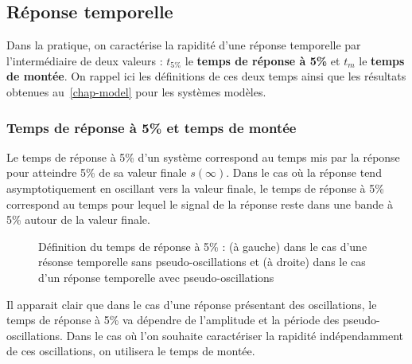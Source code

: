 \subsection{Réponse temporelle}
Dans la pratique, on caractérise la rapidité d'une réponse temporelle par 
l'intermédiaire de deux valeurs : $t_{5\%}$ le \textbf{temps de réponse à 5\%}
et $t_m$ le \textbf{temps de montée}. 
On rappel ici les définitions de ces deux temps ainsi que 
les résultats obtenues au~\cref{chap-model} pour les systèmes modèles.
\subsubsection{Temps de réponse à 5\% et temps de montée}
Le temps de réponse à 5\% d'un système correspond au temps mis par la réponse 
pour atteindre 5\% de sa valeur finale $s(\infty)$. Dans le cas où la réponse 
tend asymptotiquement en oscillant vers la valeur finale, le temps de
réponse à 5\% correspond au temps pour lequel le signal de la réponse reste
dans une bande à 5\% autour de la valeur finale. 
\begin{figure}[!h]
    \centering
    
    
    \caption{Définition du temps de réponse à 5\% : (à gauche) dans le cas
             d'une résonse temporelle sans pseudo-oscillations et (à droite) 
             dans le cas d'un réponse temporelle avec pseudo-oscillations}
\end{figure}
Il apparait clair que dans le cas d'une réponse présentant des oscillations,
le temps de réponse à 5\% va dépendre de l'amplitude et la période des 
pseudo-oscillations. Dans le cas où l'on souhaite caractériser la rapidité
indépendamment de ces oscillations, on utilisera le temps de montée.

